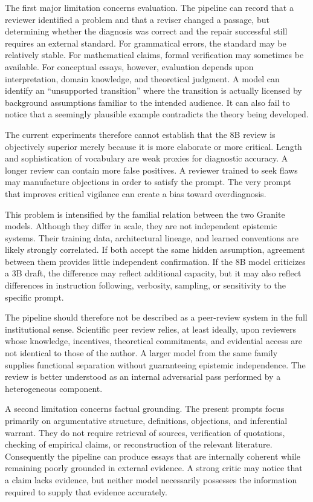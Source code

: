 \documentclass[11pt]{article}
\begin{document}
The first major limitation concerns evaluation. The pipeline can record that a reviewer identified a problem and that a reviser changed a passage, but determining whether the diagnosis was correct and the repair successful still requires an external standard. For grammatical errors, the standard may be relatively stable. For mathematical claims, formal verification may sometimes be available. For conceptual essays, however, evaluation depends upon interpretation, domain knowledge, and theoretical judgment. A model can identify an ``unsupported transition'' where the transition is actually licensed by background assumptions familiar to the intended audience. It can also fail to notice that a seemingly plausible example contradicts the theory being developed.

The current experiments therefore cannot establish that the 8B review is objectively superior merely because it is more elaborate or more critical. Length and sophistication of vocabulary are weak proxies for diagnostic accuracy. A longer review can contain more false positives. A reviewer trained to seek flaws may manufacture objections in order to satisfy the prompt. The very prompt that improves critical vigilance can create a bias toward overdiagnosis.

This problem is intensified by the familial relation between the two Granite models. Although they differ in scale, they are not independent epistemic systems. Their training data, architectural lineage, and learned conventions are likely strongly correlated. If both accept the same hidden assumption, agreement between them provides little independent confirmation. If the 8B model criticizes a 3B draft, the difference may reflect additional capacity, but it may also reflect differences in instruction following, verbosity, sampling, or sensitivity to the specific prompt.

The pipeline should therefore not be described as a peer-review system in the full institutional sense. Scientific peer review relies, at least ideally, upon reviewers whose knowledge, incentives, theoretical commitments, and evidential access are not identical to those of the author. A larger model from the same family supplies functional separation without guaranteeing epistemic independence. The review is better understood as an internal adversarial pass performed by a heterogeneous component.

A second limitation concerns factual grounding. The present prompts focus primarily on argumentative structure, definitions, objections, and inferential warrant. They do not require retrieval of sources, verification of quotations, checking of empirical claims, or reconstruction of the relevant literature. Consequently the pipeline can produce essays that are internally coherent while remaining poorly grounded in external evidence. A strong critic may notice that a claim lacks evidence, but neither model necessarily possesses the information required to supply that evidence accurately.
\end{document}
